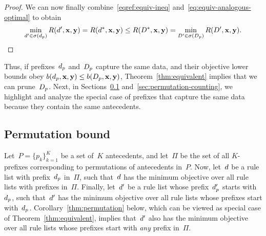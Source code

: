\begin{arxiv}
\begin{proof}
We can now finally combine~\eqref{eqref:equiv-ineq}
and~\eqref{eq:equiv-analogous-optimal} to obtain
\begin{align}
\min_{{d}' \in \sigma(d_p)} R({d}', \mathbf{x}, \mathbf{y})
= R({d}^*, \mathbf{x}, \mathbf{y}) \le R({D}^*, \mathbf{x}, \mathbf{y})
= \min_{{D}' \in \sigma(D_p)} R({D}', \mathbf{x}, \mathbf{y}).
\end{align}
\end{proof}
\end{arxiv}

Thus, if prefixes~$d_p$ and~$D_p$ capture the same data,
and their objective lower bounds obey
${b(d_p, \mathbf{x}, \mathbf{y}) \le b(D_p, \mathbf{x}, \mathbf{y})}$,
Theorem~\ref{thm:equivalent} implies that we can prune~$D_p$.
%
%
Next, in Sections~\ref{sec:permutation} and~\ref{sec:permutation-counting},
we highlight and analyze the special case of prefixes that capture
the same data because they contain the same antecedents.

\subsection{Permutation bound}%
\label{sec:permutation}

Let~${P = \{p_k\}_{k=1}^K}$ be a set of~$K$ antecedents,
and let~$\Pi$ be the set of all $K$-prefixes corresponding to
permutations of antecedents in~$P$.
%
Now, let~${d}$ be a rule list with prefix~$d_p$ in~$\Pi$,
such that~${d}$ has the minimum objective over all rule lists
with prefixes in~$\Pi$.
%
Finally, let~${d}'$ be a rule list whose prefix~$d_p'$
starts with~$d_p$, such that~${d}'$ has the minimum objective
over all rule lists whose prefixes start with~$d_p$.
%
Corollary~\ref{thm:permutation} below,
which can be viewed as special case of Theorem~\ref{thm:equivalent},
implies that~${d}'$ also has the minimum objective over all
rule lists whose prefixes start with \emph{any} prefix in~$\Pi$.

